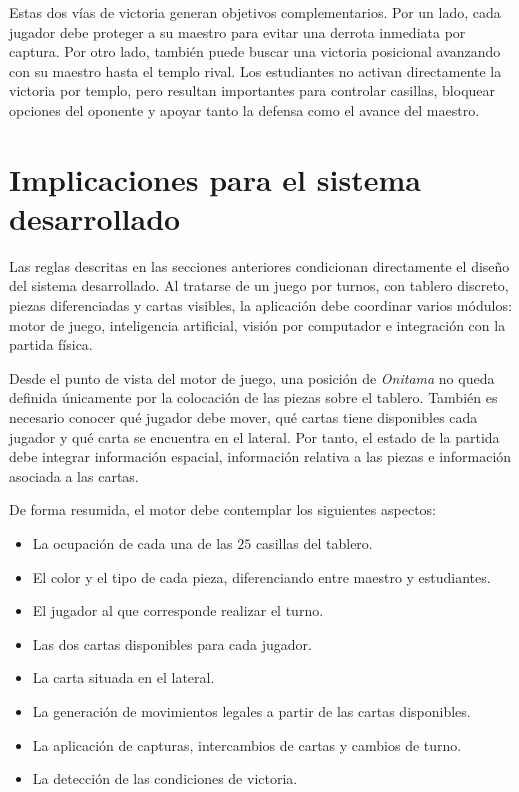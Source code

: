 Estas dos vías de victoria generan objetivos complementarios. Por un lado, cada jugador debe proteger a su maestro para evitar una derrota inmediata por captura. Por otro lado, también puede buscar una victoria posicional avanzando con su maestro hasta el templo rival. Los estudiantes no activan directamente la victoria por templo, pero resultan importantes para controlar casillas, bloquear opciones del oponente y apoyar tanto la defensa como el avance del maestro.


\section{Implicaciones para el sistema desarrollado}
\label{sec:implicaciones-sistema-onitama}

Las reglas descritas en las secciones anteriores condicionan directamente el diseño del sistema desarrollado. Al tratarse de un juego por turnos, con tablero discreto, piezas diferenciadas y cartas visibles, la aplicación debe coordinar varios módulos: motor de juego, inteligencia artificial, visión por computador e integración con la partida física.

Desde el punto de vista del motor de juego, una posición de \textit{Onitama} no queda definida únicamente por la colocación de las piezas sobre el tablero. También es necesario conocer qué jugador debe mover, qué cartas tiene disponibles cada jugador y qué carta se encuentra en el lateral. Por tanto, el estado de la partida debe integrar información espacial, información relativa a las piezas e información asociada a las cartas.

De forma resumida, el motor debe contemplar los siguientes aspectos:

\begin{itemize}
    \item La ocupación de cada una de las \(25\) casillas del tablero.
    \item El color y el tipo de cada pieza, diferenciando entre maestro y estudiantes.
    \item El jugador al que corresponde realizar el turno.
    \item Las dos cartas disponibles para cada jugador.
    \item La carta situada en el lateral.
    \item La generación de movimientos legales a partir de las cartas disponibles.
    \item La aplicación de capturas, intercambios de cartas y cambios de turno.
    \item La detección de las condiciones de victoria.
\end{itemize}

